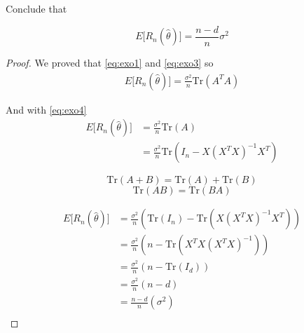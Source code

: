 
Conclude that

\begin{equation}
     E \Big[ R_n (\hat{\theta}) \Big] = \frac{n - d}{n} \sigma^2 
\end{equation}

\begin{proof}
    We proved that \eqref{eq:exo1} and \eqref{eq:exo3} so
    \begin{align*}
        E \Big[ R_n (\hat{\theta}) \Big] = \frac{\sigma^2}{n} \mathrm {Tr} (A^T A)
    \end{align*}

    And with \eqref{eq:exo4}
    \begin{align*}
        E \Big[ R_n (\hat{\theta}) \Big] &=\frac{\sigma^2}{n}  \mathrm {Tr} (A)\\
            &= \frac{\sigma^2}{n} \mathrm {Tr} (I_n - X (X^T X)^{-1} X^T)
    \end{align*}

    \begin{equation}
        \mathrm {Tr} (A + B) =\mathrm {Tr} (A) + \mathrm {Tr} (B)
    \end{equation}
    \begin{equation}
        \mathrm {Tr} (AB) = \mathrm {Tr} (BA)
    \end{equation}

    \begin{align*}
        E \Big[ R_n (\hat{\theta}) \Big]
            &= \frac{\sigma^2}{n} (\mathrm {Tr} (I_n) - \mathrm {Tr} (X (X^T X)^{-1} X^T))\\
            &= \frac{\sigma^2}{n} (n - \mathrm {Tr} (X^TX (X^T X)^{-1}))\\
            &= \frac{\sigma^2}{n} (n - \mathrm {Tr} (I_d))\\
            &= \frac{\sigma^2}{n} (n - d)\\
            &= \frac{n - d}{n} (\sigma^2)\\
    \end{align*}
\end{proof}
